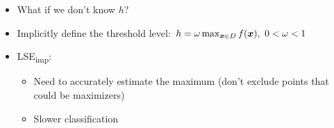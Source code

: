 \documentclass[10pt,mathserif,serif]{beamer}
\newcommand{\iacl}{\textsf{LSE\textsubscript{imp}}\xspace}
\begin{document}
\begin{frame}
\begin{itemize}
\item<1-> What if we don't know $h$?
\item<2-> Implicitly define the threshold level: $h = \omega \max_{\bm{x}\in D} f(\bm{x}),\ 0 < \omega < 1$
\item<5-> \iacl:
\begin{itemize}
\item<5-> Need to accurately estimate the maximum (don't exclude points that could be maximizers)
\item<6-> Slower classification
\end{itemize}
\end{itemize}
\begin{center}
\color{white}
\color{black}
\end{center}
\end{frame}
\end{document}
